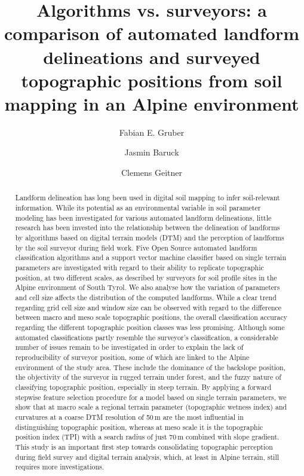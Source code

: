 \documentclass[preprint,12pt,authoryear]{elsarticle}
\begin{document}
\begin{frontmatter}

\title{Algorithms vs. surveyors: a comparison of automated landform delineations and surveyed topographic positions from soil mapping in an Alpine environment}



\author[mymainadress]{Fabian E. Gruber}
\author[mymainadress]{Jasmin Baruck}
\author[mymainadress]{Clemens Geitner}



\address[mymainadress]{Institute of Geography, University of Innsbruck, Innrain 52f, 6020 Innsbruck, Austria}

\begin{abstract}
Landform delineation has long been used in digital soil mapping to infer soil-relevant information. While its potential as an environmental variable in soil parameter modeling has been investigated for various automated landform delineations, little research has been invested into the relationship between the delineation of landforms by algorithms based on digital terrain models (DTM) and the perception of landforms by the soil surveyor during field work. Five Open Source automated landform classification algorithms and a support vector machine classifier based on single terrain parameters are investigated  with regard to their ability to replicate topographic position, at two different scales, as described by surveyors for soil profile sites in the Alpine environment of South Tyrol. We also analyse how the variation of parameters and cell size affects the distribution of the computed landforms. While a clear trend regarding grid cell size and window size can be observed with regard to the difference between macro and meso scale topographic positions, the overall classification accuracy regarding the different topographic position classes was less promising. Although some automated classifications partly resemble the surveyor's classification, a considerable number of issues remain to be investigated in order to explain the lack of reproducibility of surveyor position, some of which are linked to the Alpine environment of the study area. These include the dominance of the backslope position, the objectivity of the surveyor in rugged terrain under forest, and the fuzzy nature of classifying topographic position, especially in steep terrain. By applying a forward stepwise feature selection procedure for a model based on single terrain parameters, we show that at macro scale a regional terrain parameter (topographic wetness index) and curvatures at a coarse DTM resolution of 50\,m are the most influential in distinguishing topographic position, whereas at meso scale it is the topographic position index (TPI) with a search radius of just 70\,m combined with slope gradient. This study is an important first step towards consolidating topographic perception during field survey and digital terrain analysis, which, at least in Alpine terrain, still requires more investigations.
 

\end{abstract}
\end{frontmatter}
\end{document}
